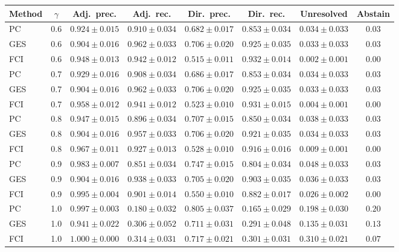 \begin{tabular}{lccccccc}
\toprule
Method & $\gamma$ & Adj.\ prec. & Adj.\ rec. & Dir.\ prec. & Dir.\ rec. & Unresolved & Abstain \\
\midrule
PC & 0.6 & $0.924\pm0.015$ & $0.910\pm0.034$ & $0.682\pm0.017$ & $0.853\pm0.034$ & $0.034\pm0.033$ & $0.03$ \\
GES & 0.6 & $0.904\pm0.016$ & $0.962\pm0.033$ & $0.706\pm0.020$ & $0.925\pm0.035$ & $0.033\pm0.033$ & $0.03$ \\
FCI & 0.6 & $0.948\pm0.013$ & $0.942\pm0.012$ & $0.515\pm0.011$ & $0.932\pm0.014$ & $0.002\pm0.001$ & $0.00$ \\
PC & 0.7 & $0.929\pm0.016$ & $0.908\pm0.034$ & $0.686\pm0.017$ & $0.853\pm0.034$ & $0.034\pm0.033$ & $0.03$ \\
GES & 0.7 & $0.904\pm0.016$ & $0.962\pm0.033$ & $0.706\pm0.020$ & $0.925\pm0.035$ & $0.033\pm0.033$ & $0.03$ \\
FCI & 0.7 & $0.958\pm0.012$ & $0.941\pm0.012$ & $0.523\pm0.010$ & $0.931\pm0.015$ & $0.004\pm0.001$ & $0.00$ \\
PC & 0.8 & $0.947\pm0.015$ & $0.896\pm0.034$ & $0.707\pm0.015$ & $0.850\pm0.034$ & $0.038\pm0.033$ & $0.03$ \\
GES & 0.8 & $0.904\pm0.016$ & $0.957\pm0.033$ & $0.706\pm0.020$ & $0.921\pm0.035$ & $0.034\pm0.033$ & $0.03$ \\
FCI & 0.8 & $0.967\pm0.011$ & $0.927\pm0.013$ & $0.528\pm0.010$ & $0.916\pm0.016$ & $0.009\pm0.001$ & $0.00$ \\
PC & 0.9 & $0.983\pm0.007$ & $0.851\pm0.034$ & $0.747\pm0.015$ & $0.804\pm0.034$ & $0.048\pm0.033$ & $0.03$ \\
GES & 0.9 & $0.904\pm0.016$ & $0.938\pm0.033$ & $0.705\pm0.020$ & $0.903\pm0.035$ & $0.036\pm0.033$ & $0.03$ \\
FCI & 0.9 & $0.995\pm0.004$ & $0.901\pm0.014$ & $0.550\pm0.010$ & $0.882\pm0.017$ & $0.026\pm0.002$ & $0.00$ \\
PC & 1.0 & $0.997\pm0.003$ & $0.180\pm0.032$ & $0.805\pm0.037$ & $0.165\pm0.029$ & $0.198\pm0.030$ & $0.20$ \\
GES & 1.0 & $0.941\pm0.022$ & $0.306\pm0.052$ & $0.711\pm0.031$ & $0.291\pm0.048$ & $0.135\pm0.031$ & $0.13$ \\
FCI & 1.0 & $1.000\pm0.000$ & $0.314\pm0.031$ & $0.717\pm0.021$ & $0.301\pm0.031$ & $0.310\pm0.021$ & $0.07$ \\
\bottomrule
\end{tabular}
